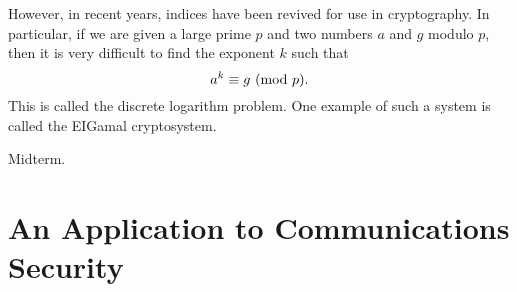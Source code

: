 However, in recent years, indices have been revived for use in cryptography.
In particular, if we are given a large prime $p$ and two numbers $a$ and $g$ modulo $p$,
then it is very difficult to find the exponent $k$ such that
\[ a^k\equiv g\ (\mathrm{mod}\ p). \]
This is called the discrete logarithm problem. One example of such a system is
called the EIGamal cryptosystem.

Midterm.

\section{An Application to Communications Security}

